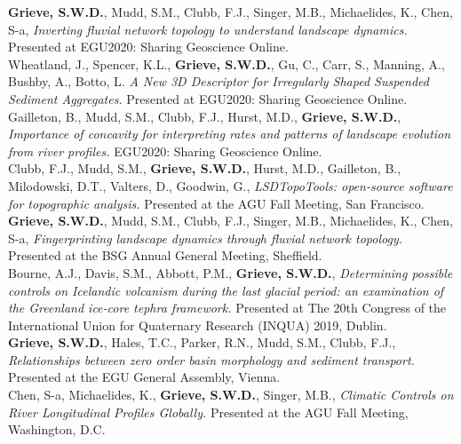 \documentclass[10pt, a4paper]{article}
\newcommand{\years}[1]{\marginnote{\scriptsize #1}}
\begin{document}
\years{2020}\textbf{Grieve, S.W.D.}, Mudd, S.M., Clubb, F.J., Singer, M.B., Michaelides, K., Chen, S-a, \textit{Inverting fluvial network topology to understand landscape dynamics.} Presented at EGU2020: Sharing Geoscience Online.\\[0.05cm]

\years{2020}Wheatland, J., Spencer, K.L., \textbf{Grieve, S.W.D.}, Gu, C., Carr, S., Manning, A., Bushby, A., Botto, L. \textit{A New 3D Descriptor for Irregularly Shaped Suspended Sediment Aggregates.} Presented at EGU2020: Sharing Geoscience Online.\\[0.05cm]

\years{2020}Gailleton, B., Mudd, S.M., Clubb, F.J., Hurst, M.D., \textbf{Grieve, S.W.D.}, \textit{Importance of concavity for interpreting rates and patterns of landscape evolution from river profiles.} EGU2020: Sharing Geoscience Online.\\[0.05cm]

\years{2019}Clubb, F.J., Mudd, S.M., \textbf{Grieve, S.W.D.}, Hurst, M.D., Gailleton, B., Milodowski, D.T., Valters, D., Goodwin, G., \textit{LSDTopoTools: open-source software for topographic analysis.} Presented at the AGU Fall Meeting, San Francisco.\\[0.05cm]

\years{2019}\textbf{Grieve, S.W.D.}, Mudd, S.M., Clubb, F.J., Singer, M.B., Michaelides, K., Chen, S-a, \textit{Fingerprinting landscape dynamics through fluvial network topology.} Presented at the BSG Annual General Meeting, Sheffield.\\[0.05cm]

\years{2019}Bourne, A.J., Davis, S.M., Abbott, P.M., \textbf{Grieve, S.W.D.}, \textit{Determining possible controls on Icelandic volcanism during the last glacial period: an examination of the Greenland ice-core tephra framework.} Presented at The 20th Congress of the International Union for Quaternary Research (INQUA) 2019, Dublin.\\[0.05cm]

\years{2019}\textbf{Grieve, S.W.D.}, Hales, T.C., Parker, R.N., Mudd, S.M., Clubb, F.J., \textit{Relationships between zero order basin morphology and sediment transport.} Presented at the EGU General Assembly, Vienna.\\[0.05cm]

\years{2018}Chen, S-a, Michaelides, K., \textbf{Grieve, S.W.D.}, Singer, M.B., \textit{Climatic Controls on River Longitudinal Profiles Globally.} Presented at the AGU Fall Meeting, Washington, D.C.\\[0.05cm]
\end{document}
